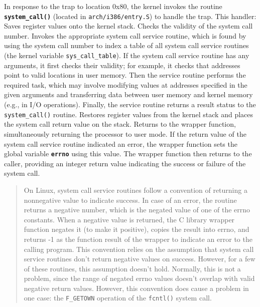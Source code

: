 \documentclass{note}
\begin{document}
{\w In response to the trap to location 0x80, the kernel invokes the routine
\textbf{\texttt{system\_call()}} 
(located in \texttt{arch/i386/entry.S}) to handle the
trap. This handler:
\ben
\w Saves register values onto the kernel stack.
\w  Checks the validity of the system call number.
\w Invokes the appropriate system call service routine, which is found by
using the system call number to index a table of all system call service
routines (the kernel variable \texttt{sys\_call\_table}). If the system call
service routine has any arguments, it first checks their validity; for
example, it checks that addresses point to valid locations in user
memory. Then the service routine performs the required task, which may involve
modifying values at addresses specified in the given arguments and
transferring data between user memory and kernel memory 
(e.g., in I/O operations). Finally, the service routine returns a result
status to the \texttt{system\_call()} routine. 
\w Restores register values from the kernel stack and places the system call
return value on the stack.
\w Returns to the wrapper function, simultaneously returning the processor
to user mode.
\een
\w If the return value of the system call service routine indicated an error,
the 
wrapper function sets the global variable \textbf{\texttt{errno}} using this
value. The wrapper function then returns to the caller, providing an integer
return value indicating the success or failure of the system call.
\begin{quote}
On Linux, system call service routines follow a convention of returning a
nonnegative value to indicate success. In case of an error, the routine
returns a negative number, which is the negated value of one of the errno
constants. 
When a negative value is returned, the C library wrapper function negates it
(to make it positive), copies the result into errno, and returns -1 as the
function result of the wrapper to indicate an error to the calling program.
This convention relies on the assumption that system call service routines
don't return negative values on success. However, for a few of these routines,
this assumption doesn't hold. Normally, this is not a problem, since the range
of negated errno values doesn't overlap with valid negative return
values. However, 
this convention does cause a problem in one case: the \texttt{F\_GETOWN}
operation of the \texttt{fcntl()} system call.

\end{quote}
\een

\vspace*{0.4cm}

}
\end{document}
